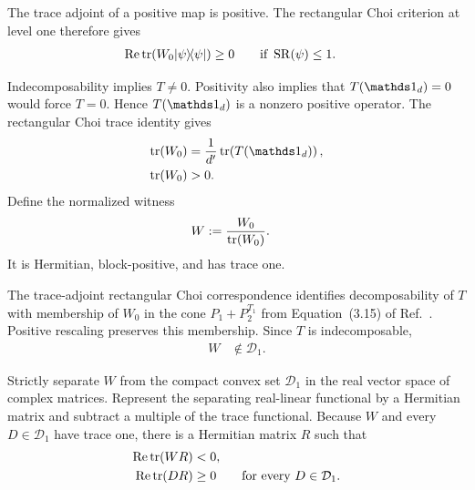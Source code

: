 \documentclass{article}
\begin{document}
The trace adjoint of a positive map is positive. The rectangular Choi
criterion at level one therefore gives
\begin{align}
    \operatorname{Re}\operatorname{tr}\!\left(W_0|\psi\rangle\!\langle \psi|\right)
        &\geq0
        \qquad\text{if }\operatorname{SR}(\psi)\leq1.
    \label{eq:wolf_prop3_5_reverse_implication_block_positivity}
\end{align}

Indecomposability implies $T\neq0$. Positivity also implies that
$T(\Id_d)=0$ would force $T=0$. Hence $T(\Id_d)$ is a nonzero positive
operator. The rectangular Choi trace identity gives
\begin{align}
    \tr(W_0)
        &=\frac{1}{d'}\tr\!\left(T(\Id_d)\right),
    \label{eq:wolf_prop3_5_reverse_implication_choi_trace_identity}\\
    \tr(W_0)
        &>0.
    \label{eq:wolf_prop3_5_reverse_implication_positive_witness_trace}
\end{align}
Define the normalized witness
\begin{align}
    W
        &:=\frac{W_0}{\operatorname{tr}(W_0)}.
    \label{eq:wolf_prop3_5_reverse_implication_normalized_witness}
\end{align}
It is Hermitian, block-positive, and has trace one.

The trace-adjoint rectangular Choi correspondence identifies
decomposability of $T$ with membership of $W_0$ in the cone
$P_1+P_2^{T_1}$ from Equation~(3.15) of
Ref.~\cite{Wolf2012Quantum}. Positive rescaling preserves this membership.
Since $T$ is indecomposable,
\begin{align}
    W
        &\notin\mathcal D_1.
    \label{eq:wolf_prop3_5_reverse_implication_outside_normalized_set}
\end{align}

Strictly separate $W$ from the compact convex set $\mathcal D_1$ in the real
vector space of complex matrices. Represent the separating real-linear
functional by a Hermitian matrix and subtract a multiple of the trace
functional. Because $W$ and every $D\in\mathcal D_1$ have trace one, there is
a Hermitian matrix $R$ such that
\begin{align}
    \operatorname{Re}\operatorname{tr}(WR)
        &<0,
    \label{eq:wolf_prop3_5_reverse_implication_strict_negative_pairing}\\
    \operatorname{Re}\operatorname{tr}(DR)
        &\geq0
        \qquad\text{for every }D\in\mathcal D_1.
    \label{eq:wolf_prop3_5_reverse_implication_nonnegative_set_pairing}
\end{align}
\end{document}
